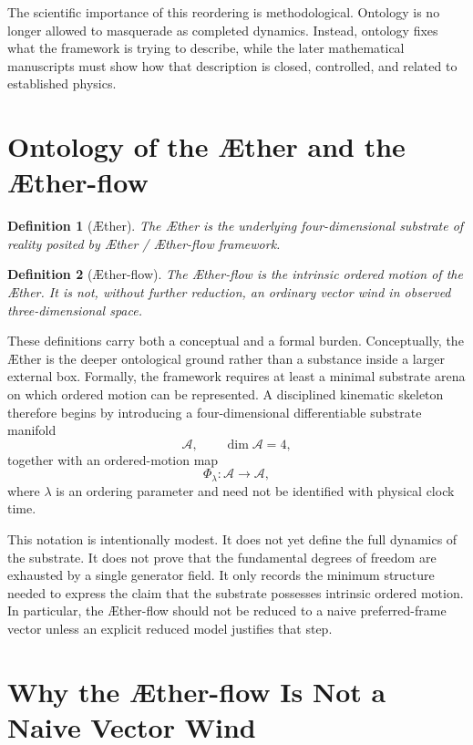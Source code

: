 \documentclass[11pt]{article}
\newcommand{\Aether}{\AE{}ther}
\newcommand{\Aflow}{\AE{}ther-flow}
\newcommand{\TheoryProgram}{\Aether{} / \Aflow{} framework}
\newcommand{\Sub}{\mathcal{A}}
\newtheorem{definition}{Definition}
\begin{document}
The scientific importance of this reordering is methodological. Ontology is no longer allowed to masquerade as completed dynamics. Instead, ontology fixes what the framework is trying to describe, while the later mathematical manuscripts must show how that description is closed, controlled, and related to established physics.

\section{Ontology of the \Aether{} and the \Aflow{}}

\begin{definition}[\Aether{}]
The \Aether{} is the underlying four-dimensional substrate of reality posited by \TheoryProgram{}.
\end{definition}

\begin{definition}[\Aflow{}]
The \Aflow{} is the intrinsic ordered motion of the \Aether{}. It is not, without further reduction, an ordinary vector wind in observed three-dimensional space.
\end{definition}

These definitions carry both a conceptual and a formal burden. Conceptually, the \Aether{} is the deeper ontological ground rather than a substance inside a larger external box. Formally, the framework requires at least a minimal substrate arena on which ordered motion can be represented. A disciplined kinematic skeleton therefore begins by introducing a four-dimensional differentiable substrate manifold
\[
\Sub,
\qquad
\dim \Sub = 4,
\]
together with an ordered-motion map
\[
\Phi_{\lambda}:\Sub \to \Sub,
\]
where \(\lambda\) is an ordering parameter and need not be identified with physical clock time.

This notation is intentionally modest. It does not yet define the full dynamics of the substrate. It does not prove that the fundamental degrees of freedom are exhausted by a single generator field. It only records the minimum structure needed to express the claim that the substrate possesses intrinsic ordered motion. In particular, the \Aflow{} should not be reduced to a naive preferred-frame vector unless an explicit reduced model justifies that step.

\section{Why the \Aflow{} Is Not a Naive Vector Wind}
\end{document}
